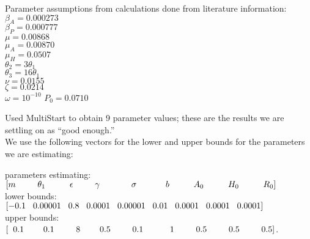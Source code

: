 \documentclass[12pt]{article}
\begin{document}
Parameter assumptions from calculations done from literature information: \\
$\beta_A=0.000273$ \\
$\beta_P=0.000777$ \\
$\mu=0.00868$ \\
$\mu_{A}=0.00870$ \\
$\mu_{H}=0.0507$ \\
$\theta_2=3 \theta_1$ \\
$\theta_3=16\theta_1$ \\
$\nu=0.0155$ \\ 
$\zeta=0.0214$ \\
$\omega=10^{-10}$ 
$P_0=0.0710$

Used MultiStart to obtain 9 parameter values; these are the results we are settling on as ``good enough.''  \\
We use the following vectors for the lower and upper bounds for the parameters we are estimating: 

parameters estimating: $[m \hspace{0.9cm}   \theta_1 \hspace{1cm}   \epsilon \hspace{0.9cm} \gamma \hspace{1.3cm}  \sigma \hspace{1.2cm}   b \hspace{1cm}    A_0 \hspace{1cm}   H_0  \hspace{1cm}   R_0 ]$ \\
lower bounds:  \hspace{1.2cm} $[-0.1 \hspace{0.3cm}  0.00001 \hspace{0.3cm}    0.8 \hspace{0.3cm}      0.0001  \hspace{0.3cm}        0.00001 \hspace{0.3cm}     0.01 \hspace{0.3cm}     0.0001 \hspace{0.3cm}    0.0001 \hspace{0.3cm}     0.0001  ]$ \\
upper bounds:\hspace{1.2cm} $[\hspace{0.2cm}0.1 \hspace{0.8cm}     0.1  \hspace{0.9cm}        8  \hspace{0.8cm}        0.5  \hspace{0.9cm}           0.1 \hspace{1.1cm}        1  \hspace{0.9cm}        0.5   \hspace{0.9cm}     0.5    \hspace{0.9cm}    0.5     ]$.
\end{document}
